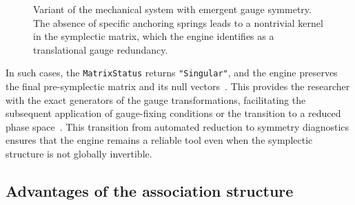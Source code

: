 \documentclass[11pt,a4paper]{article}
\begin{document}
\begin{figure}[H]
	\caption{Variant of the mechanical system with emergent gauge symmetry. The absence of specific anchoring springs leads to a nontrivial kernel in the symplectic matrix, which the engine identifies as a translational gauge redundancy.}
	\label{fig:gauge_system}
\end{figure}

In such cases, the \texttt{MatrixStatus} returns \texttt{"Singular"}, and the engine preserves the final pre-symplectic matrix and its null vectors~\cite{Henneaux1992,GitmanTyutin1990}. This provides the researcher with the exact generators of the gauge transformations, facilitating the subsequent application of gauge-fixing conditions or the transition to a reduced phase space~\cite{Marsden1999,MarsdenWeinstein1974,ArnoldBook}. This transition from automated reduction to symmetry diagnostics ensures that the engine remains a reliable tool even when the symplectic structure is not globally invertible.



\subsection{Advantages of the association structure}
\end{document}

